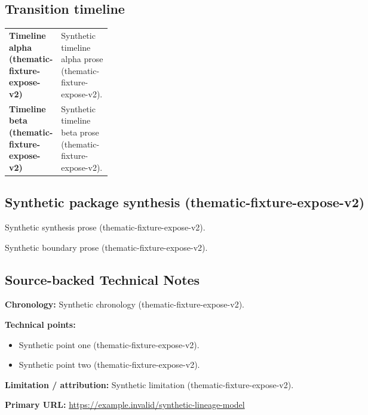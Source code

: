 \documentclass[lualatex,a4paper,10pt]{jlreq}
\begin{document}
\medskip
\begin{wideflow}
\subsection*{Transition timeline}
\begin{tabularx}{\linewidth}{@{}>{\bfseries}p{0.20\linewidth}X@{}}
Timeline alpha (thematic-fixture-expose-v2) & Synthetic timeline alpha prose (thematic-fixture-expose-v2). \cite{sp001lnd001} \\
Timeline beta (thematic-fixture-expose-v2) & Synthetic timeline beta prose (thematic-fixture-expose-v2). \cite{sp001lnd001} \\
\end{tabularx}
\end{wideflow}
\medskip
\begin{multicols}{2}
\subsection*{Synthetic package synthesis (thematic-fixture-expose-v2)}
\noindent Synthetic synthesis prose (thematic-fixture-expose-v2). \cite{sp001lnd001}\par\medskip
\end{multicols}
\medskip
\begin{claimboundary}
\noindent Synthetic boundary prose (thematic-fixture-expose-v2). \cite{sp001lnd001}\par
\end{claimboundary}
\medskip
\subsection*{Source-backed Technical Notes}
\begin{technicalnote}
\noindent\textbf{Chronology:} Synthetic chronology (thematic-fixture-expose-v2). \cite{sp001lnd001}\par
\smallskip\noindent\textbf{Technical points:}\par
\begin{itemize}
\item Synthetic point one (thematic-fixture-expose-v2). \cite{sp001lnd001}
\item Synthetic point two (thematic-fixture-expose-v2). \cite{sp001lnd001}
\end{itemize}
\noindent\textbf{Limitation / attribution:} Synthetic limitation (thematic-fixture-expose-v2).\par
\smallskip\noindent\textbf{Primary URL:} \url{https://example.invalid/synthetic-lineage-model}\par
\end{technicalnote}
\smallskip
\Needspace{0.30\textheight}
\end{document}
